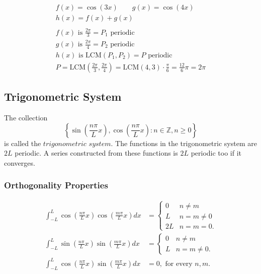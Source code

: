 \begin{examplesection}
    \noindent
    \begin{gather*}
        f(x) = \cos(3x) \qquad g(x) = \cos(4x) \\
        h(x) = f(x) + g(x) \\\\
        f(x) \text{ is } \frac{2\pi}{3}=P_1 \text{ periodic} \\
        g(x) \text{ is } \frac{2\pi}{4}=P_2 \text{ periodic} \\
        h(x) \text{ is LCM} (P_1, P_2)=P \text{ periodic} \\
        P=\text{LCM}(\frac{2\pi}{3}, \frac{2\pi}{4}) = \text{LCM}(4,3)\cdot\frac{\pi}{6} = \frac{12}{6}\pi = 2\pi
    \end{gather*}
\end{examplesection}

\subsection{Trigonometric System}
The collection
\begin{equation*}
    \left\{\sin\left(\frac{n\pi}Lx\right),\cos\left(\frac{n\pi}Lx\right):n\in\mathbb{Z},n\geq0\right\}
\end{equation*}
is called the $trigonometric$ $system$. The functions in the trigonometric system are $2L$ periodic. A series constructed from these functions is $2L$ periodic too if it converges.

\subsubsection{Orthogonality Properties}
\noindent
\begin{align*}
    \int_{-L}^L\cos\left(\frac{n\pi}Lx\right)\cos\left(\frac{m\pi}Lx\right)dx&=\begin{cases}0&n\neq m\\L&n=m\neq0\\2L&n=m=0.\end{cases} \\
    \int_{-L}^L\sin\left(\frac{n\pi}Lx\right)\sin\left(\frac{m\pi}Lx\right)dx&=\begin{cases}0&n\neq m\\L&n=m\neq0.\end{cases}           \\
    \int_{-L}^L\cos\left(\frac{n\pi}Lx\right)\sin\left(\frac{m\pi}Lx\right)dx&=0,\text{ for every }n,m.
\end{align*}

